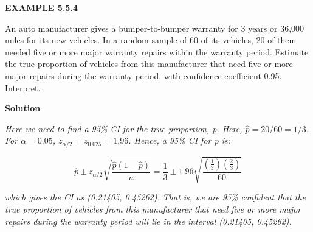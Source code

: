 \textbf{EXAMPLE 5.5.4}

An auto manufacturer gives a bumper-to-bumper warranty for 3 years or 36,000 miles for its new vehicles. In a random sample of 60 of its vehicles, 20 of them needed five or more major warranty repairs within the warranty period. Estimate the true proportion of vehicles from this manufacturer that need five or more major repairs during the warranty period, with confidence coefficient 0.95. Interpret.

\textbf{Solution}

\textit{Here we need to find a 95\% CI for the true proportion, p. Here, $\hat{p} = 20/60 = 1/3$. For $\alpha = 0.05$, $z_{\alpha/2} = z_{0.025} = 1.96$. Hence, a 95\% CI for p is:}

\[
\hat{p} \pm z_{\alpha/2} \sqrt{\frac{\hat{p}(1-\hat{p})}{n}} = \frac{1}{3} \pm 1.96 \sqrt{\frac{\left(\frac{1}{3}\right)\left(\frac{2}{3}\right)}{60}}
\]

\textit{which gives the CI as (0.21405, 0.45262). That is, we are 95\% confident that the true proportion of vehicles from this manufacturer that need five or more major repairs during the warranty period will lie in the interval (0.21405, 0.45262).}
